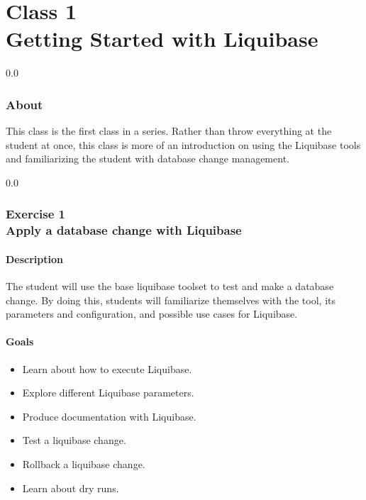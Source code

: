 \part*{Class 1\\
Getting Started with Liquibase
}

{\setlength{\baselineskip}%
  {0.0\baselineskip}
  \section*{\flushright About\\}
  \hrulefill \par}
This class is the first class in a series. Rather than throw
everything at the student at once, this class is more of an
introduction on using the Liquibase tools and familiarizing the
student with database change management.

{}
{\setlength{\baselineskip}%
  {0.0\baselineskip}
  \section*{\flushright Exercise 1\\
  Apply a database change with Liquibase}
  \hrulefill \par}

\subsection*{Description}
The student will use the base liquibase toolset to test and make a database
change. By doing this, students will familiarize themselves with the
tool, its parameters and configuration, and possible use cases for Liquibase.


\subsection*{Goals}
\begin{itemize}
  \item Learn about how to execute Liquibase.
  \item Explore different Liquibase parameters.
  \item Produce documentation with Liquibase.
  \item Test a liquibase change.
  \item Rollback a liquibase change.
  \item Learn about dry runs.
\end{itemize}

